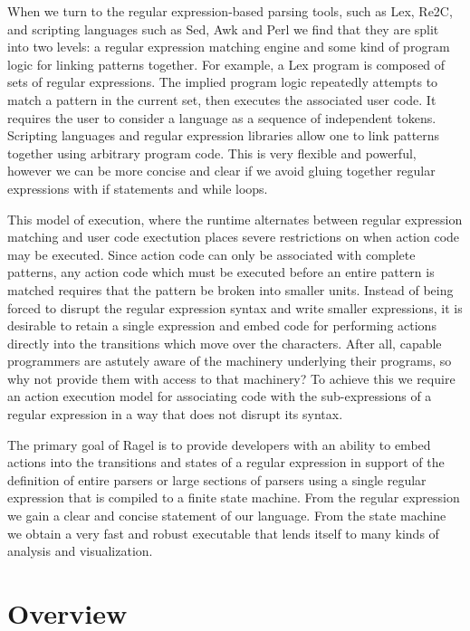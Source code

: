 \documentclass[letterpaper,11pt,oneside]{book}
\begin{document}
When we turn to the regular expression-based parsing tools, such as Lex, Re2C,
and scripting languages such as Sed, Awk and Perl we find that they are split
into two levels: a regular expression matching engine and some kind of program
logic for linking patterns together.  For example, a Lex program is composed of
sets of regular expressions. The implied program logic repeatedly attempts to
match a pattern in the current set, then executes the associated user code. It requires the
user to consider a language as a sequence of independent tokens.  Scripting
languages and regular expression libraries allow one to link patterns together
using arbitrary program code.  This is very flexible and powerful, however we
can be more concise and clear if we avoid gluing together regular expressions
with if statements and while loops.

This model of execution, where the runtime alternates between regular
expression matching and user code exectution places severe restrictions on when
action code may be executed. Since action code can only be associated with
complete patterns, any action code which must be executed before an entire
pattern is matched requires that the pattern be broken into smaller units.
Instead of being forced to disrupt the regular expression syntax and write
smaller expressions, it is desirable to retain a single expression and embed
code for performing actions directly into the transitions which move over the
characters. After all, capable programmers are astutely aware of the machinery
underlying their programs, so why not provide them with access to that
machinery? To achieve this we require an action execution model for associating
code with the sub-expressions of a regular expression in a way that does not
disrupt its syntax.

The primary goal of Ragel is to provide developers with an ability to embed
actions into the transitions and states of a regular expression in support of the
definition of entire parsers or large sections of parsers using a single
regular expression that is compiled to a finite state machine.  From the
regular expression we gain a clear and concise statement of our language. From
the state machine we obtain a very fast and robust executable that lends itself
to many kinds of analysis and visualization.

\section{Overview}
\end{document}
